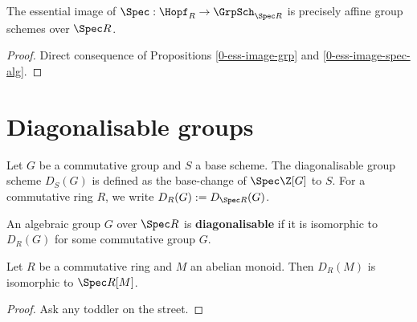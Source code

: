 \begin{proposition}
  \label{0-ess-image-spec-hopf}
  \leanok

  The essential image of $\Spec : \Hopf_R \to \GrpSch_{\Spec R}$ is precisely affine group schemes over $\Spec R$.
\end{proposition}
\begin{proof}
  \leanok

  Direct consequence of Propositions \ref{0-ess-image-grp} and \ref{0-ess-image-spec-alg}.
\end{proof}


\section{Diagonalisable groups}


\begin{definition}
  \label{0-diag}
  \leanok

  Let $G$ be a commutative group and $S$ a base scheme.
  The diagonalisable group scheme $D_S(G)$ is defined as the base-change of $\Spec \Z[G]$ to $S$.
  For a commutative ring $R$, we write $D_R(G) := D_{\Spec R}(G)$.
\end{definition}


\begin{definition}
  \label{0-is-diag}
  \leanok

  An algebraic group $G$ over $\Spec R$ is {\bf diagonalisable} if it is isomorphic to $D_R(G)$ for some commutative group $G$.
\end{definition}


\begin{lemma}
  \label{0-diag-spec}
  \leanok

  Let $R$ be a commutative ring and $M$ an abelian monoid.
  Then $D_R(M)$ is isomorphic to $\Spec R[M]$.
\end{lemma}
\begin{proof}
  \leanok

  Ask any toddler on the street.
\end{proof}


